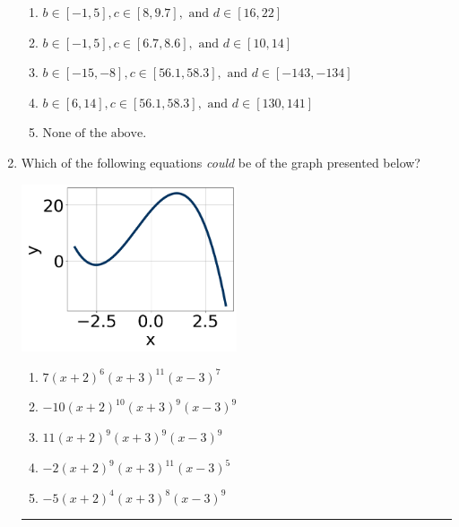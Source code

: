 \documentclass[14pt]{extbook}
\newcommand{\litem}[1]{\item#1\hspace*{-1cm}\rule{\textwidth}{0.4pt}}
\begin{document}
\begin{enumerate}
{\begin{enumerate}[label=\Alph*.]
\item \( b \in [-1, 5], c \in [8, 9.7], \text{ and } d \in [16, 22] \)
\item \( b \in [-1, 5], c \in [6.7, 8.6], \text{ and } d \in [10, 14] \)
\item \( b \in [-15, -8], c \in [56.1, 58.3], \text{ and } d \in [-143, -134] \)
\item \( b \in [6, 14], c \in [56.1, 58.3], \text{ and } d \in [130, 141] \)
\item \( \text{None of the above.} \)

\end{enumerate} }
\litem{
Which of the following equations \textit{could} be of the graph presented below?
\begin{center}
    \includegraphics[width=0.5\textwidth]{../Figures/polyGraphToFunctionCopyC.png}
\end{center}
\begin{enumerate}[label=\Alph*.]
\item \( 7(x + 2)^{6} (x + 3)^{11} (x - 3)^{7} \)
\item \( -10(x + 2)^{10} (x + 3)^{9} (x - 3)^{9} \)
\item \( 11(x + 2)^{9} (x + 3)^{9} (x - 3)^{9} \)
\item \( -2(x + 2)^{9} (x + 3)^{11} (x - 3)^{5} \)
\item \( -5(x + 2)^{4} (x + 3)^{8} (x - 3)^{9} \)


\end{enumerate}}
\end{enumerate}
\end{document}
